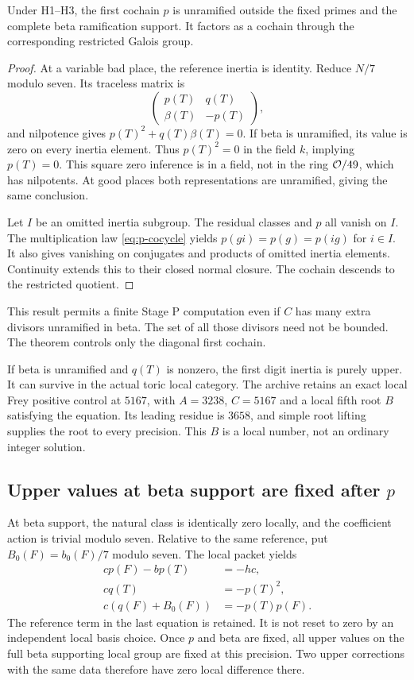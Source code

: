 \begin{proposition}\label{prop:pinertia}
Under H1--H3, the first cochain $p$ is unramified outside the fixed primes and the complete beta ramification support. It factors as a cochain through the corresponding restricted Galois group.
\end{proposition}
\begin{proof}
At a variable bad place, the reference inertia is identity. Reduce $N/7$ modulo seven. Its traceless matrix is
\[
\begin{pmatrix}p(T)&q(T)\\\beta(T)&-p(T)\end{pmatrix},
\]
and nilpotence gives $p(T)^2+q(T)\beta(T)=0$. If beta is unramified, its value is zero on every inertia element. Thus $p(T)^2=0$ in the field $k$, implying $p(T)=0$. This square zero inference is in a field, not in the ring $\mathcal O/49$, which has nilpotents. At good places both representations are unramified, giving the same conclusion.

Let $I$ be an omitted inertia subgroup. The residual classes and $p$ all vanish on $I$. The multiplication law \eqref{eq:p-cocycle} yields $p(gi)=p(g)=p(ig)$ for $i\in I$. It also gives vanishing on conjugates and products of omitted inertia elements. Continuity extends this to their closed normal closure. The cochain descends to the restricted quotient.
\end{proof}
This result permits a finite Stage P computation even if $C$ has many extra divisors unramified in beta. The set of all those divisors need not be bounded. The theorem controls only the diagonal first cochain.

If beta is unramified and $q(T)$ is nonzero, the first digit inertia is purely upper. It can survive in the actual toric local category. The archive retains an exact local Frey positive control at $5167$, with $A=3238$, $C=5167$ and a local fifth root $B$ satisfying the equation. Its leading residue is $3658$, and simple root lifting supplies the root to every precision. This $B$ is a local number, not an ordinary integer solution.

\subsection{Upper values at beta support are fixed after \texorpdfstring{$p$}{p}}
At beta support, the natural class is identically zero locally, and the coefficient action is trivial modulo seven. Relative to the same reference, put $B_0(F)=b_0(F)/7$ modulo seven. The local packet yields
\begin{align}
cp(F)-bp(T)&=-hc,\label{eq:p-support}\\
cq(T)&=-p(T)^2,\label{eq:q-inertia}\\
c(q(F)+B_0(F))&=-p(T)p(F).\label{eq:q-frob}
\end{align}
The reference term in the last equation is retained. It is not reset to zero by an independent local basis choice. Once $p$ and beta are fixed, all upper values on the full beta supporting local group are fixed at this precision. Two upper corrections with the same data therefore have zero local difference there.

